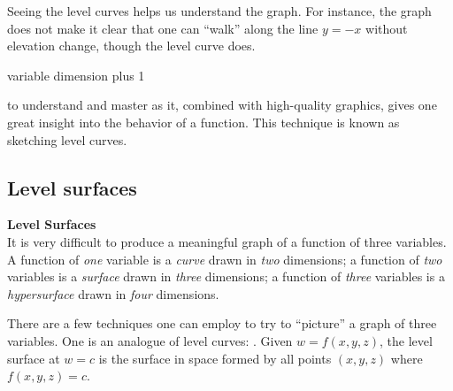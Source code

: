 \documentclass{ximera}
\begin{document}
\begin{example}
\begin{explanation}
\begin{image}
    \end{image}
    Seeing the level curves helps us understand the graph. For
    instance, the graph does not make it clear that one can ``walk''
    along the line $y=-x$ without elevation change, though the level
    curve does.
  \end{explanation}
\end{example}


variable dimension plus 1

to understand and master as it, combined with high-quality graphics,
gives one great insight into the behavior of a function. This technique
is known as sketching level curves.





\subsection{Level surfaces}


\noindent\textbf{\large Level Surfaces}\\

It is very difficult to produce a meaningful graph of a function of
three variables. A function of \textit{one} variable is a
\textit{curve} drawn in \textit{two} dimensions; a function of
\textit{two} variables is a \textit{surface} drawn in \textit{three}
dimensions; a function of \textit{three} variables is a
\textit{hypersurface} drawn in \textit{four} dimensions.

There are a few techniques one can employ to try to ``picture'' a
graph of three variables. One is an analogue of level curves:
. Given $w=f(x,y,z)$, the level surface at $w=c$
is the surface in space formed by all points $(x,y,z)$ where
$f(x,y,z)=c$. 
\end{document}

